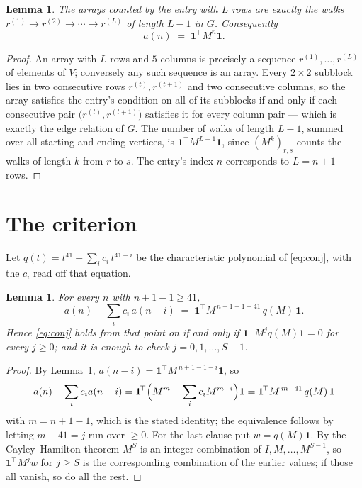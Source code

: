 \documentclass[11pt,a4paper]{article}
\theoremstyle{plain}
\newtheorem{lemma}[theorem]{Lemma}
\theoremstyle{definition}
\begin{document}
\begin{lemma}\label{lem:walk}
The arrays counted by the entry with $L$ rows are exactly the walks
$r^{(1)}\to r^{(2)}\to\cdots\to r^{(L)}$ of length $L-1$ in $G$. Consequently
\[
a(n)\;=\;\mathbf{1}^{\!\top}M^{n}\mathbf{1} .
\]
\end{lemma}

\begin{proof}
An array with $L$ rows and $5$ columns is precisely a sequence
$r^{(1)},\dots,r^{(L)}$ of elements of $V$; conversely any such sequence is an array.
Every $2\times2$ subblock lies in two consecutive rows $r^{(t)},r^{(t+1)}$ and two
consecutive columns, so the array satisfies the entry's condition on all of its subblocks
if and only if each consecutive pair $\bigl(r^{(t)},r^{(t+1)}\bigr)$ satisfies it for
every column pair --- which is exactly the edge relation of $G$. The number of walks of
length $L-1$, summed over all starting and ending vertices, is
$\mathbf{1}^{\!\top}M^{L-1}\mathbf{1}$, since $(M^{k})_{r,s}$ counts the walks of
length $k$ from $r$ to $s$. The entry's index $n$ corresponds to $L=n+1$ rows.
\end{proof}

\section{The criterion}

Let $q(t)=t^{41}-\sum_i c_i\,t^{41-i}$ be the characteristic polynomial of
\eqref{eq:conj}, with the $c_i$ read off that equation.

\begin{lemma}\label{lem:crit}
For every $n$ with $n+1-1\ge41$,
\[
a(n)-\sum_i c_i\,a(n-i)\;=\;\mathbf{1}^{\!\top}M^{\,n+1-1-41}\,q(M)\,\mathbf{1} .
\]
Hence \eqref{eq:conj} holds from that point on if and only if
$\mathbf{1}^{\!\top}M^{j}q(M)\mathbf{1}=0$ for every $j\ge0$; and it is enough to check
$j=0,1,\dots,S-1$.
\end{lemma}

\begin{proof}
By Lemma~\ref{lem:walk}, $a(n-i)=\mathbf{1}^{\!\top}M^{\,n+1-1-i}\mathbf{1}$, so
\[
a(n)-\sum_i c_i a(n-i)
=\mathbf{1}^{\!\top}\Bigl(M^{m}-\sum_i c_i M^{m-i}\Bigr)\mathbf{1}
=\mathbf{1}^{\!\top}M^{\,m-41}\,q(M)\,\mathbf{1}
\]
with $m=n+1-1$, which is the stated identity; the equivalence follows by letting
$m-41=j$ run over $\ge0$. For the last clause put $w=q(M)\mathbf{1}$. By the
Cayley--Hamilton theorem $M^{S}$ is an integer combination of $I,M,\dots,M^{S-1}$, so
$\mathbf{1}^{\!\top}M^{j}w$ for $j\ge S$ is the corresponding combination of the earlier
values; if those all vanish, so do all the rest.
\end{proof}
\end{document}
